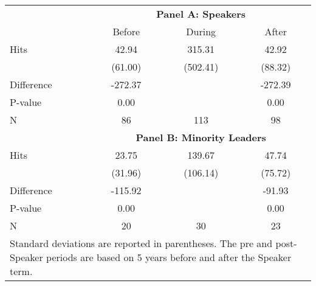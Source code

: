 \documentclass[11pt]{article}
\begin{document}
\begin{table}[t]
\centering
\begin{tabular}{l ccc}
\toprule \toprule
 & \multicolumn{3}{c}{\bf{Panel A: Speakers}} \\[2mm]
 & Before & During & After \\
\midrule
 Hits & 42.94 & 315.31 & 42.92\\
 & (61.00) & (502.41) & (88.32) \\[2mm]
\midrule
 Difference & -272.37 &  & -272.39\\
 P-value & 0.00 &  & 0.00\\
 N &  86 & 113 &  98 \\
\midrule\midrule
 & \multicolumn{3}{c}{\bf{Panel B: Minority Leaders}} \\[2mm]
 Hits & 23.75 & 139.67 & 47.74\\
 & (31.96) & (106.14) & (75.72) \\[2mm]
\midrule
 Difference & -115.92 &  & -91.93\\
 P-value & 0.00 &  & 0.00\\
 N &  20 &  30 &  23 \\
\bottomrule \bottomrule
\multicolumn{4}{p{.4\textwidth}}{Standard deviations are reported in parentheses. The pre and post-Speaker 
 periods are based on 5 years before and after the Speaker term. }\\
\end{tabular}
\end{table}
\end{document}
